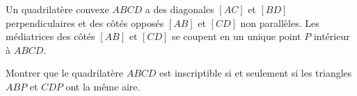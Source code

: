 Un quadrilatère convexe $ABCD$ a des diagonales $[AC]$ et $[BD]$ perpendiculaires et des côtés opposés $[AB]$ et $[CD]$ non parallèles. Les médiatrices des côtés $[AB]$ et $[CD]$ se coupent en un unique point $P$ intérieur à $ABCD$.

Montrer que le quadrilatère $ABCD$ est inscriptible si et seulement si les triangles $ABP$ et $CDP$ ont la même aire.
